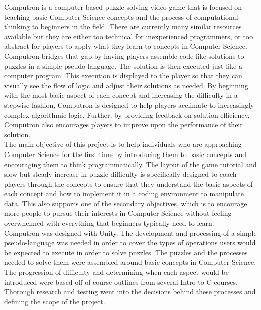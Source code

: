 Computron is a computer based puzzle-solving video game that is focused on teaching basic Computer Science concepts and the process of computational thinking to beginners in the field. There are currently many similar resources available but they are either too technical for inexperienced programmers, or too abstract for players to apply what they learn to concepts in Computer Science. Computron bridges that gap by having players assemble code-like solutions to puzzles in a simple pseudo-language. The solution is then executed just like a computer program. This execution is displayed to the player so that they can visually see the flow of logic and adjust their solutions as needed. By beginning with the most basic aspect of each concept and increasing the difficulty in a stepwise fashion, Computron is designed to help players acclimate to increasingly complex algorithmic logic. Further, by providing feedback on solution efficiency, Computron also encourages players to improve upon the performance of their solution.\\

The main objective of this project is to help individuals who are approaching Computer Science for the first time by introducing them to basic concepts and encouraging them to think programmatically. The layout of the game tutorial and slow but steady increase in puzzle difficulty is specifically designed to coach players through the concepts to ensure that they understand the basic aspects of each concept and how to implement it in a coding environment to manipulate data. This also supports one of the secondary objectives, which is to encourage more people to pursue their interests in Computer Science without feeling overwhelmed with everything that beginners typically need to learn.\\

Computron was designed with Unity. The development and processing of a simple pseudo-language was needed in order to cover the types of operations users would be expected to execute in order to solve puzzles. The puzzles and the processes needed to solve them were assembled around basic concepts in Computer Science. The progression of difficulty and determining when each aspect would be introduced were based off of course outlines from several Intro to C courses. Thorough research and testing went into the decisions behind these processes and defining the scope of the project.\\
